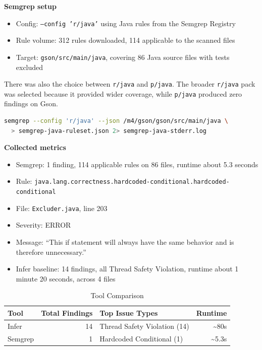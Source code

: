 \documentclass[11pt]{article}
\begin{document}
\textbf{Semgrep setup}
\begin{itemize}
\item Config: \texttt{--config 'r/java'} using Java rules from the Semgrep Registry
\item Rule volume: 312 rules downloaded, 114 applicable to the scanned files
\item Target: \texttt{gson/src/main/java}, covering 86 Java source files with tests excluded
\end{itemize}

There was also the choice between \texttt{r/java} and \texttt{p/java}. The broader \texttt{r/java} pack was selected because it provided wider coverage, while \texttt{p/java} produced zero findings on Gson.

\begin{lstlisting}[language=bash]
semgrep --config 'r/java' --json /m4/gson/gson/src/main/java \
  > semgrep-java-ruleset.json 2> semgrep-java-stderr.log
\end{lstlisting}

\textbf{Collected metrics}
\begin{itemize}
\item Semgrep: 1 finding, 114 applicable rules on 86 files, runtime about 5.3 seconds
\item Rule: \texttt{java.lang.correctness.hardcoded-conditional.hardcoded-conditional}
\item File: \texttt{Excluder.java}, line 203
\item Severity: ERROR
\item Message: ``This if statement will always have the same behavior and is therefore unnecessary.''
\item Infer baseline: 14 findings, all Thread Safety Violation, runtime about 1 minute 20 seconds, across 4 files
\end{itemize}

\begin{table}[H]
\centering
\caption{Tool Comparison}
\begin{tabular}{lrlr}
\toprule
Tool & Total Findings & Top Issue Types & Runtime \\
\midrule
Infer & 14 & Thread Safety Violation (14) & \textasciitilde 80s \\
Semgrep & 1 & Hardcoded Conditional (1) & \textasciitilde 5.3s \\
\bottomrule
\end{tabular}
\end{table}
\end{document}
